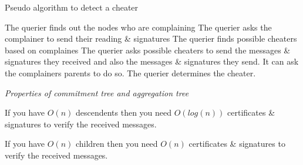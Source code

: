 \begin{algorithm}
\caption{Pseudo algorithm to detect a cheater}
	\begin{algorithmic}[1]
			\STATE The querier finds out the nodes who are complaining 
			\STATE The querier asks the complainer to send their reading \& signatures
			\STATE The querier finds possible cheaters based on complaines
			\STATE The querier asks possible cheaters to send the messages \& signatures they received and also the messages \& signatures they send. It can ask the complainers parents to do so.
			\STATE The querier determines the cheater. 
	\end{algorithmic}
\end{algorithm}


\textit{Properties of commitment tree and aggregation tree}


	If you have $O(n)$ descendents then you need $O(log(n))$ certificates \& signatures to verify the received messages.

	If you have $O(n)$ children then you need $O(n)$ certificates \& signatures to verify the received messages.